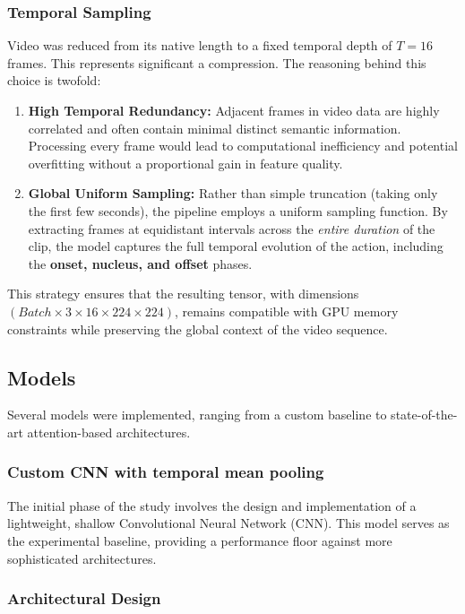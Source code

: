 \subsubsection{Temporal Sampling}
Video was reduced from its native length to a fixed temporal depth of $T=16$ frames. This represents significant a compression. The reasoning behind this choice is twofold:
\begin{enumerate}
    \item \textbf{High Temporal Redundancy:} Adjacent frames in video data are highly correlated and often contain minimal distinct semantic information. Processing every frame would lead to computational inefficiency and potential overfitting without a proportional gain in feature quality.
    \item \textbf{Global Uniform Sampling:} Rather than simple truncation (taking only the first few seconds), the pipeline employs a uniform sampling function. By extracting frames at equidistant intervals across the \textit{entire duration} of the clip, the model captures the full temporal evolution of the action, including the \textbf{onset, nucleus, and offset} phases.
\end{enumerate}
\noindent
This strategy ensures that the resulting tensor, with dimensions $(Batch \times 3 \times 16 \times 224 \times 224)$, remains compatible with GPU memory constraints while preserving the global context of the video sequence.

\subsection{Models}
Several models were implemented, ranging from a custom baseline to state-of-the-art attention-based architectures.

\subsubsection{Custom CNN with temporal mean pooling}
The initial phase of the study involves the design and implementation of a lightweight, shallow Convolutional Neural Network (CNN). This model serves as the experimental baseline, providing a performance floor against more sophisticated architectures.

\subsubsection*{Architectural Design}

